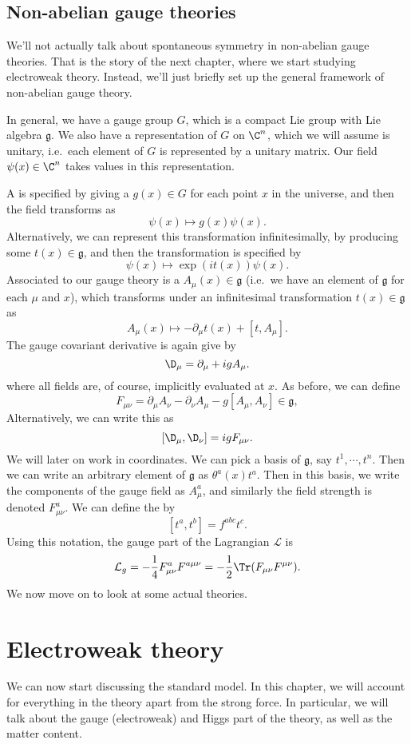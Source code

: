 \documentclass[a4paper]{article}
\begin{document}
\subsection{Non-abelian gauge theories}
We'll not actually talk about spontaneous symmetry in non-abelian gauge theories. That is the story of the next chapter, where we start studying electroweak theory. Instead, we'll just briefly set up the general framework of non-abelian gauge theory.

In general, we have a gauge group $G$, which is a compact Lie group with Lie algebra $\mathfrak{g}$. We also have a representation of $G$ on $\C^n$, which we will assume is unitary, i.e.\ each element of $G$ is represented by a unitary matrix. Our field $\psi(x) \in \C^n$ takes values in this representation.

A  is specified by giving a $g(x) \in G$ for each point $x$ in the universe, and then the field transforms as
\[
  \psi(x) \mapsto g(x) \psi(x).
\]
Alternatively, we can represent this transformation infinitesimally, by producing some $t(x) \in \mathfrak{g}$, and then the transformation is specified by
\[
  \psi(x) \mapsto \exp(i t(x)) \psi(x).
\]
Associated to our gauge theory is a  $A_\mu(x) \in \mathfrak{g}$ (i.e.\ we have an element of $\mathfrak{g}$ for each $\mu$ and $x$), which transforms under an infinitesimal transformation $t(x) \in \mathfrak{g}$ as
\[
  A_\mu(x) \mapsto - \partial_\mu t(x) + [t, A_\mu].
\]
The gauge covariant derivative is again give by
\[
  \D_\mu = \partial_\mu + i g A_\mu.
\]
where all fields are, of course, implicitly evaluated at $x$. As before, we can define
\[
  F_{\mu\nu} = \partial_\mu A_\nu - \partial_\nu A_\mu - g [A_\mu, A_\nu] \in \mathfrak{g},
\]
Alternatively, we can write this as
\[
  [\D_\mu, \D_\nu] = ig F_{\mu\nu}.
\]
We will later on work in coordinates. We can pick a basis of $\mathfrak{g}$, say $t^1, \cdots, t^n$. Then we can write an arbitrary element of $\mathfrak{g}$ as $\theta^a(x) t^a$. Then in this basis, we write the components of the gauge field as $A_\mu^a$, and similarly the field strength is denoted $F_{\mu\nu}^a$. We can define the   by
\[
  [t^a, t^b] = f^{abc}t^c.
\]
Using this notation, the gauge part of the Lagrangian $\mathcal{L}$ is
\[
  \mathcal{L}_g = -\frac{1}{4} F_{\mu\nu}^a F^{a\mu\nu} = - \frac{1}{2} \Tr (F_{\mu\nu} F^{\mu\nu}).
\]
We now move on to look at some actual theories.

\section{Electroweak theory}
We can now start discussing the standard model. In this chapter, we will account for everything in the theory apart from the strong force. In particular, we will talk about the gauge (electroweak) and Higgs part of the theory, as well as the matter content.
\end{document}

